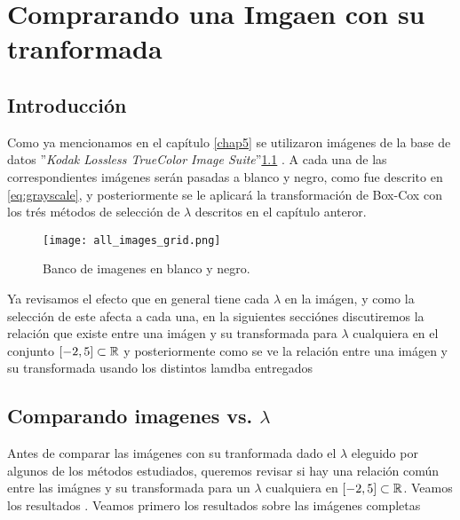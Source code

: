 \chapter{Comprarando una Imgaen con su tranformada}\label{chap7}

\section{Introducci\'on}

    Como ya mencionamos en el cap\'itulo \ref{chap5} se utilizaron im\'agenes de la base de datos ''\textit{Kodak Lossless TrueColor Image Suite}''\ref{fig:rgb2gray_2} \cite{KodakLosslessTrueColorImageSuite}. A cada una de las correspondientes im\'agenes ser\'an pasadas a blanco y negro, como fue descrito en \ref{eq:grayscale}, y posteriormente se le aplicar\'a la transformaci\'on de Box-Cox con los tr\'es m\'etodos de selecci\'on de $\lambda$ descritos en el cap\'itulo anteror.

    \begin{figure}[H]
        \centering
        \texttt{[image: all\_images\_grid.png]}
        \caption{Banco de imagenes en blanco y negro.}
        \label{fig:rgb2gray_2}
    \end{figure}
    
    Ya revisamos el efecto que en general tiene cada $\lambda$ en la im\'agen, y como la selecci\'on de este afecta a cada una, en la siguientes secci\'ones discutiremos la relaci\'on que existe entre una im\'agen y su transformada para $\lambda$ cualquiera en el conjunto $[-2, 5]\subset\mathbb{R}$ y posteriormente como se ve la relaci\'on entre una im\'agen y su transformada usando los distintos lamdba entregados 
    
\section[Comparando imagenes vs. lambda]{Comparando imagenes vs. $\lambda$}

    Antes de comparar las im\'agenes con su tranformada dado el $\lambda$ eleguido por algunos de los m\'etodos estudiados, queremos revisar si hay una relaci\'on com\'un entre las im\'agnes y su transformada para un $\lambda$ cualquiera en $[-2, 5]\subset\mathbb{R}$. Veamos los resultados . Veamos primero los resultados sobre las im\'agenes completas


